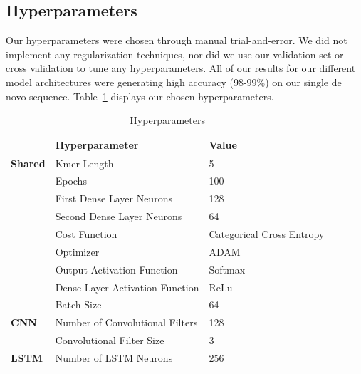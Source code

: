 \documentclass[journal]{IEEEtran}
\begin{document}
  \subsection{Hyperparameters}

    Our hyperparameters were chosen through manual trial-and-error. We did not implement
    any regularization techniques, nor did we use our validation set or cross validation to tune 
    any hyperparameters. All of our results for our different model architectures were generating
    high accuracy (98-99\%) on our single de novo sequence. Table~\ref{tab:hyperparameters}
    displays our chosen hyperparameters.

    \begin{table}[h!]
      \begin{center}
        \caption{Hyperparameters}
        \label{tab:hyperparameters}
        \begin{tabular}{l|l|l} %
          & \textbf{Hyperparameter} & \textbf{Value} \\
          \hline
          \textbf{Shared} & Kmer Length                      & 5 \\
                          & Epochs                           & 100 \\
                          & First Dense Layer Neurons        & 128 \\
                          & Second Dense Layer Neurons       & 64 \\
                          & Cost Function                    & Categorical Cross Entropy \\
                          & Optimizer                        & ADAM \\
                          & Output Activation Function       & Softmax \\
                          & Dense Layer Activation Function  & ReLu \\
                          & Batch Size                       & 64 \\
          \hline
          \textbf{CNN}    & Number of Convolutional Filters  & 128 \\
                          & Convolutional Filter Size        & 3 \\
          \hline
          \textbf{LSTM}   & Number of LSTM Neurons           & 256 \\
        \end{tabular}
      \end{center}
    \end{table}
\end{document}
